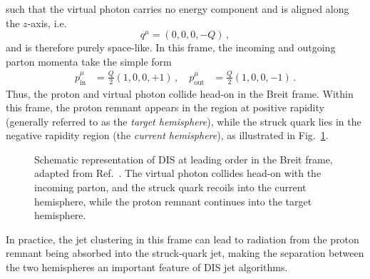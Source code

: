 such that the virtual photon carries no energy component and is aligned along the $z$-axis, i.e.\
\begin{equation}
\label{eq:DIS-photon}
    q^\mu = (0,0,0,-Q)\,,
\end{equation}
and is therefore purely space-like.  
In this frame, the incoming and outgoing parton momenta take the simple form
\begin{equation}
\begin{aligned}
\label{eq:DIS-partons}
    p_{\mathrm{in}} ^\mu &= \frac{Q}{2}(1,0,0,+1)\,, \quad
    p_{\mathrm{out}}^{\mu} &= \frac{Q}{2}(1,0,0,-1)\,.
\end{aligned}
\end{equation}
Thus, the proton and virtual photon collide
head-on  in the Breit frame.
%
Within this frame, the proton remnant appears in the region at
positive rapidity (generally referred to as the \emph{target hemisphere}), while the struck
quark lies in the negative rapidity region (the \emph{current
hemisphere}),  as illustrated in Fig.~\ref{fig:breit-frame}.
\begin{figure}[h]
\centering
{}
\caption{Schematic representation of DIS at leading order in the Breit frame, adapted from Ref.~\cite{Arratia:2020ssx}. The virtual photon collides head-on with the incoming parton, and the struck quark recoils into the current hemisphere, while the proton remnant continues into the target hemisphere.}
\label{fig:breit-frame}
\end{figure}
%
In practice, the jet clustering in this frame can lead to radiation
from the proton remnant being absorbed into the struck-quark jet,
making the separation between the two hemispheres an important feature
of DIS jet algorithms.

